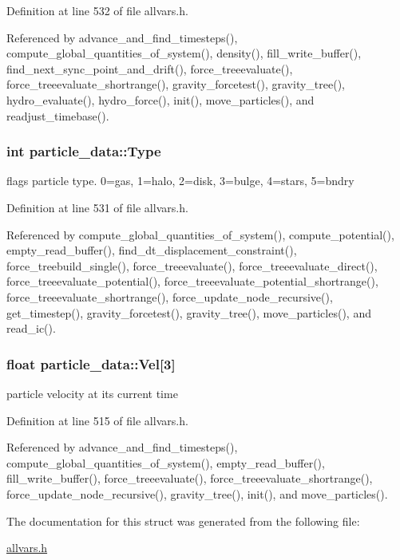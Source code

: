 Definition at line 532 of file allvars.h.



Referenced by advance\_\-and\_\-find\_\-timesteps(), compute\_\-global\_\-quantities\_\-of\_\-system(), density(), fill\_\-write\_\-buffer(), find\_\-next\_\-sync\_\-point\_\-and\_\-drift(), force\_\-treeevaluate(), force\_\-treeevaluate\_\-shortrange(), gravity\_\-forcetest(), gravity\_\-tree(), hydro\_\-evaluate(), hydro\_\-force(), init(), move\_\-particles(), and readjust\_\-timebase().

\hypertarget{structparticle__data_ab6119b261ff95e8f84ae171139704cbd}{
\subsubsection[{Type}]{\setlength{\rightskip}{0pt plus 5cm}int {\bf particle\_\-data::Type}}}
\label{structparticle__data_ab6119b261ff95e8f84ae171139704cbd}
flags particle type. 0=gas, 1=halo, 2=disk, 3=bulge, 4=stars, 5=bndry 

Definition at line 531 of file allvars.h.



Referenced by compute\_\-global\_\-quantities\_\-of\_\-system(), compute\_\-potential(), empty\_\-read\_\-buffer(), find\_\-dt\_\-displacement\_\-constraint(), force\_\-treebuild\_\-single(), force\_\-treeevaluate(), force\_\-treeevaluate\_\-direct(), force\_\-treeevaluate\_\-potential(), force\_\-treeevaluate\_\-potential\_\-shortrange(), force\_\-treeevaluate\_\-shortrange(), force\_\-update\_\-node\_\-recursive(), get\_\-timestep(), gravity\_\-forcetest(), gravity\_\-tree(), move\_\-particles(), and read\_\-ic().

\hypertarget{structparticle__data_ad7808af1e23fbd920d7eb477bc68bd00}{
\subsubsection[{Vel}]{\setlength{\rightskip}{0pt plus 5cm}float {\bf particle\_\-data::Vel}\mbox{[}3\mbox{]}}}
\label{structparticle__data_ad7808af1e23fbd920d7eb477bc68bd00}
particle velocity at its current time 

Definition at line 515 of file allvars.h.



Referenced by advance\_\-and\_\-find\_\-timesteps(), compute\_\-global\_\-quantities\_\-of\_\-system(), empty\_\-read\_\-buffer(), fill\_\-write\_\-buffer(), force\_\-treeevaluate(), force\_\-treeevaluate\_\-shortrange(), force\_\-update\_\-node\_\-recursive(), gravity\_\-tree(), init(), and move\_\-particles().



The documentation for this struct was generated from the following file:\begin{DoxyCompactItemize}
\item 
\hyperlink{allvars_8h}{allvars.h}\end{DoxyCompactItemize}
